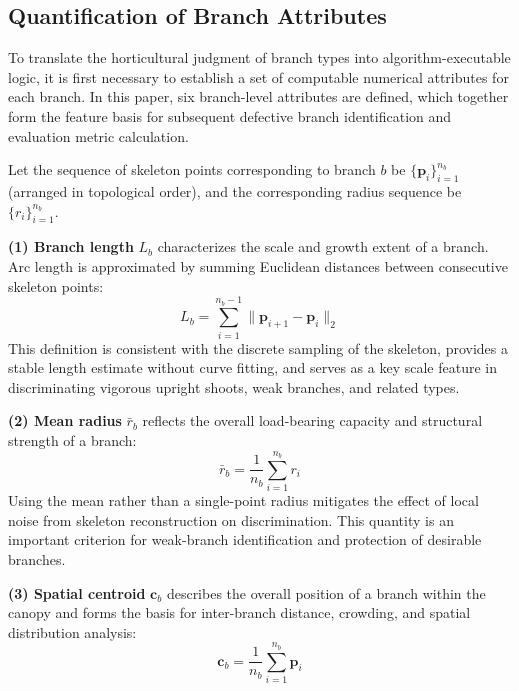 \documentclass[12pt,a4paper,fontset=fandol]{ctexart}
\newcommand{\cb}[1][b]{\mathbf{c}_{#1}}
\newcommand{\rb}{\bar{r}_b}
\begin{document}
\subsection{Quantification of Branch Attributes}\label{sec:formalization:properties}

To translate the horticultural judgment of branch types into algorithm-executable logic, it is first necessary to establish a set of computable numerical attributes for each branch. In this paper, six branch-level attributes are defined, which together form the feature basis for subsequent defective branch identification and evaluation metric calculation.

Let the sequence of skeleton points corresponding to branch $b$ be $\{\mathbf{p}_i\}_{i=1}^{n_b}$ (arranged in topological order), and the corresponding radius sequence be $\{r_i\}_{i=1}^{n_b}$.

\textbf{(1) Branch length} $L_b$ characterizes the scale and growth extent of a branch.
Arc length is approximated by summing Euclidean distances between consecutive skeleton points:
\begin{equation}\label{eq:length}
  L_b = \sum_{i=1}^{n_b - 1} \|\mathbf{p}_{i+1} - \mathbf{p}_i\|_2
\end{equation}
This definition is consistent with the discrete sampling of the skeleton,
provides a stable length estimate without curve fitting,
and serves as a key scale feature in discriminating vigorous upright shoots, weak branches, and related types.

\textbf{(2) Mean radius} $\rb$ reflects the overall load-bearing capacity and structural strength of a branch:
\begin{equation}\label{eq:radius}
  \rb = \frac{1}{n_b} \sum_{i=1}^{n_b} r_i
\end{equation}
Using the mean rather than a single-point radius mitigates the effect of local noise from skeleton reconstruction on discrimination.
This quantity is an important criterion for weak-branch identification and protection of desirable branches.

\textbf{(3) Spatial centroid} $\cb$ describes the overall position of a branch within the canopy
and forms the basis for inter-branch distance, crowding, and spatial distribution analysis:
\begin{equation}\label{eq:center}
  \cb = \frac{1}{n_b} \sum_{i=1}^{n_b} \mathbf{p}_i
\end{equation}
\end{document}
